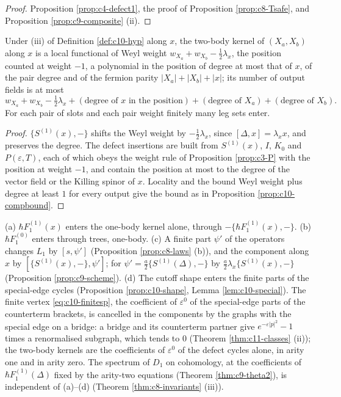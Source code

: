 \begin{proof}
Proposition \ref{prop:c4-defect1}, the proof of Proposition \ref{prop:c8-Tsafe}, and Proposition \ref{prop:c9-composite} (ii).
\end{proof}

\begin{proposition}
\label{prop:c10-bound1}
Under (iii) of Definition \ref{def:c10-hyp} along $x$, the two-body kernel of $(X_a,X_b)$ along $x$ is a local functional of Weyl weight $w_{X_a}+w_{X_b}-\tfrac12\lambda_x$, the position counted at weight $-1$, a polynomial in the position of degree at most that of $x$, of the pair degree and of the fermion parity $|X_a|+|X_b|+|x|$; its number of output fields is at most
\[
w_{X_a}+w_{X_b}-\tfrac12\lambda_x+(\text{degree of }x\text{ in the position})+(\text{degree of }X_a)+(\text{degree of }X_b).
\]
For each pair of slots and each pair weight finitely many leg sets enter.
\end{proposition}

\begin{proof}
$\{S^{(1)}(x),-\}$ shifts the Weyl weight by $-\tfrac12\lambda_x$, since $[\Delta,x]=\lambda_xx$, and preserves the degree. The defect insertions are built from $S^{(1)}(x)$, $I$, $K_0$ and $P(\varepsilon,T)$, each of which obeys the weight rule of Proposition \ref{prop:c3-P} with the position at weight $-1$, and contain the position at most to the degree of the vector field or the Killing spinor of $x$. Locality and the bound Weyl weight plus degree at least $1$ for every output give the bound as in Proposition \ref{prop:c10-compbound}.
\end{proof}

\begin{remark}
\label{rem:c10-scheme1}
(a) $\hbar F_1^{(1)}(x)$ enters the one-body kernel alone, through $-\{\hbar F_1^{(1)}(x),-\}$. (b) $\hbar F_1^{(0)}$ enters through trees, one-body. (c) A finite part $\psi'$ of the operators changes $L_1$ by $[s,\psi']$ (Proposition \ref{prop:c8-laws} (b)), and the component along $x$ by $[\{S^{(1)}(x),-\},\psi']$; for $\psi'=\tfrac a2\{S^{(1)}(\Delta),-\}$ by $\tfrac a2\lambda_x\{S^{(1)}(x),-\}$ (Proposition \ref{prop:c9-scheme}). (d) The cutoff shape enters the finite parts of the special-edge cycles (Proposition \ref{prop:c10-shape}, Lemma \ref{lem:c10-special}). The finite vertex \eqref{eq:c10-finitesp}, the coefficient of $\varepsilon^0$ of the special-edge parts of the counterterm brackets, is cancelled in the components by the graphs with the special edge on a bridge: a bridge and its counterterm partner give $e^{-\varepsilon|p|^2}-1$ times a renormalised subgraph, which tends to $0$ (Theorem \ref{thm:c11-classes} (ii)); the two-body kernels are the coefficients of $\varepsilon^0$ of the defect cycles alone, in arity one and in arity zero. The spectrum of $D_1$ on cohomology, at the coefficients of $\hbar F_1^{(1)}(\Delta)$ fixed by the arity-two equations (Theorem \ref{thm:c9-theta2}), is independent of (a)--(d) (Theorem \ref{thm:c8-invariants} (iii)).
\end{remark}


